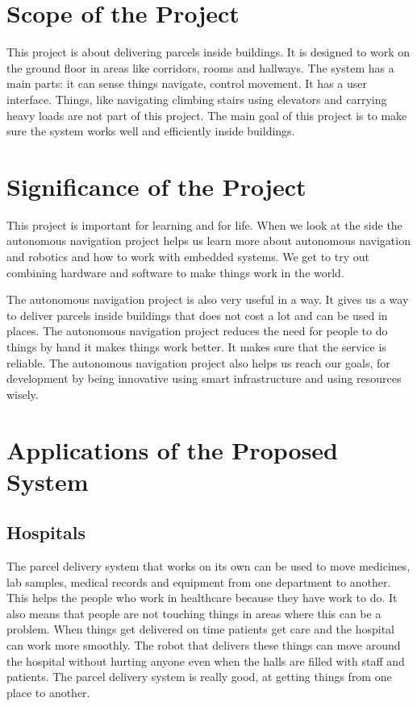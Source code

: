 \section{Scope of the Project}

This project is about delivering parcels inside buildings. It is designed to work on the ground floor in areas like corridors, rooms and hallways. The system has a main parts: it can sense things navigate, control movement. It has a user interface. Things, like navigating climbing stairs using elevators and carrying heavy loads are not part of this project. The main goal of this project is to make sure the system works well and efficiently inside buildings.

\section{Significance of the Project}
This project is important for learning and for life. When we look at the side the autonomous navigation project helps us learn more about autonomous navigation and robotics and how to work with embedded systems. We get to try out combining hardware and software to make things work in the world.

The autonomous navigation project is also very useful in a way. It gives us a way to deliver parcels inside buildings that does not cost a lot and can be used in places. The autonomous navigation project reduces the need for people to do things by hand it makes things work better. It makes sure that the service is reliable. The autonomous navigation project also helps us reach our goals, for development by being innovative using smart infrastructure and using resources wisely.

\section{Applications of the Proposed System}

\subsection{Hospitals}
The parcel delivery system that works on its own can be used to move medicines, lab samples, medical records and equipment from one department to another. This helps the people who work in healthcare because they have work to do. It also means that people are not touching things in areas where this can be a problem. When things get delivered on time patients get care and the hospital can work more smoothly. The robot that delivers these things can move around the hospital without hurting anyone even when the halls are filled with staff and patients. The parcel delivery system is really good, at getting things from one place to another.
